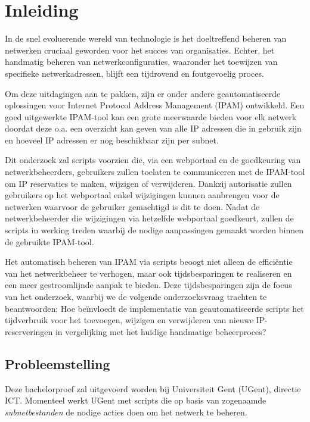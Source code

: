 
\graphicspath{ {../voorstel/img/} }

\section{Inleiding}%
\label{sec:inleiding}
In de snel evoluerende wereld van technologie is het doeltreffend beheren van netwerken cruciaal geworden voor het succes van organisaties. Echter, het handmatig beheren van netwerkconfiguraties, waaronder het toewijzen van specifieke netwerkadressen, blijft een tijdrovend en foutgevoelig proces.

Om deze uitdagingen aan te pakken, zijn er onder andere geautomatiseerde oplossingen voor Internet Protocol Address Management (IPAM) ontwikkeld. Een goed uitgewerkte IPAM-tool kan een grote meerwaarde bieden voor elk netwerk doordat deze o.a. een overzicht kan geven van alle IP adressen die in gebruik zijn en hoeveel IP adressen er nog beschikbaar zijn per subnet.

Dit onderzoek zal scripts voorzien die, via een webportaal en de goedkeuring van netwerkbeheerders, gebruikers zullen toelaten te communiceren met de IPAM-tool om IP reservaties te maken, wijzigen of verwijderen. Dankzij autorisatie zullen gebruikers op het webportaal enkel wijzigingen kunnen aanbrengen voor de netwerken waarvoor de gebruiker gemachtigd is dit te doen. Nadat de netwerkbeheerder die wijzigingen via hetzelfde webportaal goedkeurt, zullen de scripts in werking treden waarbij de nodige aanpassingen gemaakt worden binnen de gebruikte IPAM-tool.

Het automatisch beheren van IPAM via scripts beoogt niet alleen de efficiëntie van het netwerkbeheer te verhogen, maar ook tijdsbesparingen te realiseren en een meer gestroomlijnde aanpak te bieden. Deze tijdsbesparingen zijn de focus van het onderzoek, waarbij we de volgende onderzoeksvraag trachten te beantwoorden: Hoe beïnvloedt de implementatie van geautomatiseerde scripts het tijdverbruik voor het toevoegen, wijzigen en verwijderen van nieuwe IP-reserveringen in vergelijking met het huidige handmatige beheerproces?

\subsection{Probleemstelling}
\label{sec:probleemstelling}
Deze bachelorproef zal uitgevoerd worden bij Universiteit Gent (UGent), directie ICT. Momenteel werkt UGent met scripts die op basis van zogenaamde \textit{subnetbestanden} de nodige acties doen om het netwerk te beheren. 

